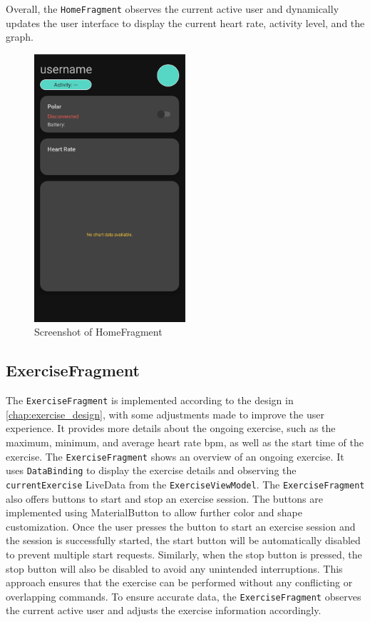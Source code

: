 Overall, the \texttt{HomeFragment} observes the current active user and dynamically updates the user interface to display the current heart rate, activity level, and the graph.
\begin{figure}[H]
    \centering
    \includegraphics[width=0.5\textwidth]{images/homefragment-screenshot.png}
    \caption{Screenshot of HomeFragment}
    \label{fig:homefragment_screenshot}
\end{figure}

\subsection{ExerciseFragment}
The \texttt{ExerciseFragment} is implemented according to the design in \autoref{chap:exercise_design}, with some adjustments made to improve the user experience.
It provides more details about the ongoing exercise, such as the maximum, minimum, and average heart rate bpm, as well as the start time of the exercise.
The \texttt{ExerciseFragment} shows an overview of an ongoing exercise. It uses \texttt{DataBinding} to display the exercise details and observing the \texttt{currentExercise} LiveData from the \texttt{ExerciseViewModel}. 
The \texttt{ExerciseFragment} also offers buttons to start and stop an exercise session. The buttons are implemented using MaterialButton to allow further color and shape customization.
Once the user presses the button to start an exercise session and the session is successfully started, the start button will be automatically disabled to prevent multiple start requests. Similarly, when the stop button is pressed, the stop button will also be disabled to avoid any unintended interruptions. 
This approach ensures that the exercise can be performed without any conflicting or overlapping commands.
To ensure accurate data, the \texttt{ExerciseFragment} observes the current active user and adjusts the exercise information accordingly.

